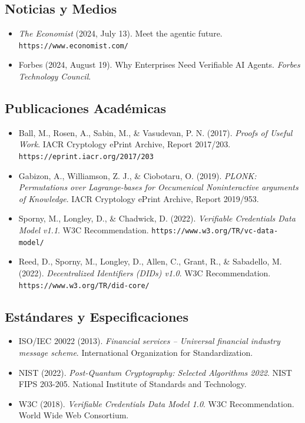 \documentclass[11pt]{article}
\begin{document}
\subsection*{Noticias y Medios}

\begin{itemize}[leftmargin=*, label={}]
  \item \textit{The Economist} (2024, July 13). Meet the agentic future. \texttt{https://www.economist.com/}

  \item Forbes (2024, August 19). Why Enterprises Need Verifiable AI Agents. \textit{Forbes Technology Council}.
\end{itemize}

\subsection*{Publicaciones Académicas}

\begin{itemize}[leftmargin=*, label={}]
  \item Ball, M., Rosen, A., Sabin, M., \& Vasudevan, P. N. (2017). \textit{Proofs of Useful Work}. IACR Cryptology ePrint Archive, Report 2017/203. \texttt{https://eprint.iacr.org/2017/203}

  \item Gabizon, A., Williamson, Z. J., \& Ciobotaru, O. (2019). \textit{PLONK: Permutations over Lagrange-bases for Oecumenical Noninteractive arguments of Knowledge}. IACR Cryptology ePrint Archive, Report 2019/953.

  \item Sporny, M., Longley, D., \& Chadwick, D. (2022). \textit{Verifiable Credentials Data Model v1.1}. W3C Recommendation. \texttt{https://www.w3.org/TR/vc-data-model/}

  \item Reed, D., Sporny, M., Longley, D., Allen, C., Grant, R., \& Sabadello, M. (2022). \textit{Decentralized Identifiers (DIDs) v1.0}. W3C Recommendation. \texttt{https://www.w3.org/TR/did-core/}
\end{itemize}

\subsection*{Estándares y Especificaciones}

\begin{itemize}[leftmargin=*, label={}]
  \item ISO/IEC 20022 (2013). \textit{Financial services -- Universal financial industry message scheme}. International Organization for Standardization.

  \item NIST (2022). \textit{Post-Quantum Cryptography: Selected Algorithms 2022}. NIST FIPS 203-205. National Institute of Standards and Technology.

  \item W3C (2018). \textit{Verifiable Credentials Data Model 1.0}. W3C Recommendation. World Wide Web Consortium.
\end{itemize}
\end{document}
